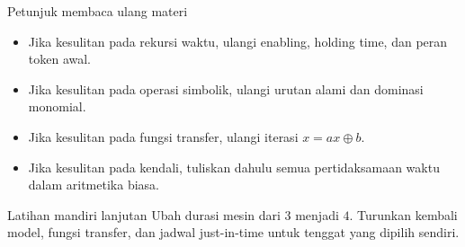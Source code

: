 \documentclass[aspectratio=169,11pt]{beamer}
\begin{document}
\begin{frame}{Petunjuk membaca ulang materi}

\begin{itemize}
\item Jika kesulitan pada rekursi waktu, ulangi enabling, holding time, dan peran token awal.
\item Jika kesulitan pada operasi simbolik, ulangi urutan alami dan dominasi monomial.
\item Jika kesulitan pada fungsi transfer, ulangi iterasi $x=ax\oplus b$.
\item Jika kesulitan pada kendali, tuliskan dahulu semua pertidaksamaan waktu dalam aritmetika biasa.
\end{itemize}
\begin{block}{Latihan mandiri lanjutan}
Ubah durasi mesin dari $3$ menjadi $4$.
Turunkan kembali model, fungsi transfer, dan jadwal just-in-time untuk tenggat yang dipilih sendiri.
\end{block}

\end{frame}
\end{document}
